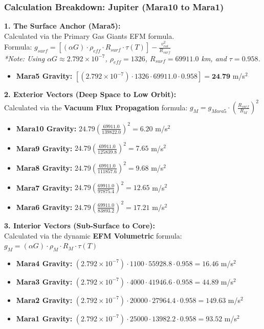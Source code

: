 \documentclass[11pt, a4paper]{article}
\begin{document}
\clearpage
\subsubsection{Calculation Breakdown: Jupiter (Mara10 to Mara1)}

\noindent \textbf{1. The Surface Anchor (Mara5):} \\
Calculated via the Primary Gas Giants EFM formula. \\
Formula: $g_{surf} = \left[ (\alpha G) \cdot \rho_{eff} \cdot R_{surf} \cdot \tau(T) \right] - \frac{v_{rot}^2}{R_{surf}}$ \\
\textit{*Note: Using $\alpha G \approx 2.792 \times 10^{-7}$, $\rho_{eff} = 1326$, $R_{surf} = 69911.0$ km, and $\tau = 0.958$.}
\begin{itemize}
  \item \textbf{Mara5 Gravity:} $\left[ (2.792 \times 10^{-7}) \cdot 1326 \cdot 69911.0 \cdot 0.958 \right] = \textbf{24.79}$ m/s$^2$
\end{itemize}

\vspace{0.5em}
\noindent \textbf{2. Exterior Vectors (Deep Space to Low Orbit):} \\
Calculated via the \textbf{Vacuum Flux Propagation} formula: $g_M = g_{Mara5} \cdot \left( \frac{R_{surf}}{R_M} \right)^2$
\begin{itemize}
  \item \textbf{Mara10 Gravity:} $24.79 \left( \frac{69911.0}{139822.0} \right)^2 = 6.20$ m/s$^2$
  \item \textbf{Mara9 Gravity:} $24.79 \left( \frac{69911.0}{125839.8} \right)^2 = 7.65$ m/s$^2$
  \item \textbf{Mara8 Gravity:} $24.79 \left( \frac{69911.0}{111857.6} \right)^2 = 9.68$ m/s$^2$
  \item \textbf{Mara7 Gravity:} $24.79 \left( \frac{69911.0}{97875.4} \right)^2 = 12.65$ m/s$^2$
  \item \textbf{Mara6 Gravity:} $24.79 \left( \frac{69911.0}{83893.2} \right)^2 = 17.21$ m/s$^2$
\end{itemize}

\vspace{0.5em}
\noindent \textbf{3. Interior Vectors (Sub-Surface to Core):} \\
Calculated via the dynamic \textbf{EFM Volumetric} formula: $g_M = (\alpha G) \cdot \rho_{M} \cdot R_M \cdot \tau(T)$
\begin{itemize}
  \item \textbf{Mara4 Gravity:} $(2.792 \times 10^{-7}) \cdot 1100 \cdot 55928.8 \cdot 0.958 = 16.46$ m/s$^2$
  \item \textbf{Mara3 Gravity:} $(2.792 \times 10^{-7}) \cdot 4000 \cdot 41946.6 \cdot 0.958 = 44.89$ m/s$^2$
  \item \textbf{Mara2 Gravity:} $(2.792 \times 10^{-7}) \cdot 20000 \cdot 27964.4 \cdot 0.958 = 149.63$ m/s$^2$
  \item \textbf{Mara1 Gravity:} $(2.792 \times 10^{-7}) \cdot 25000 \cdot 13982.2 \cdot 0.958 = 93.52$ m/s$^2$
\end{itemize}
\end{document}
